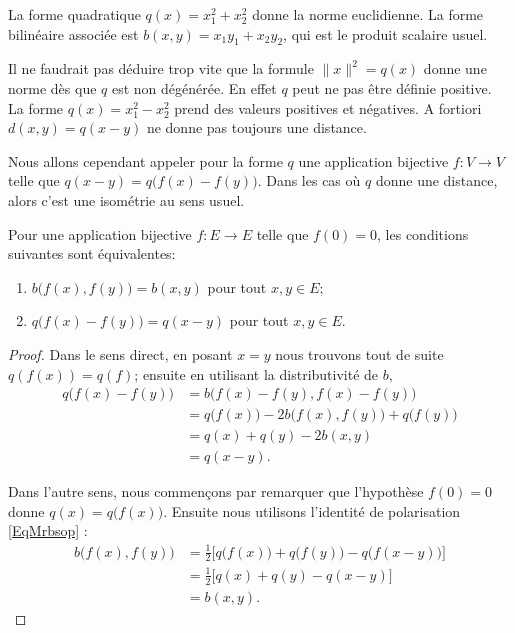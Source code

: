 \begin{example}
    La forme quadratique \( q(x)=x_1^2+x_2^2\) donne la norme euclidienne. La forme bilinéaire associée est \( b(x,y)=x_1y_1+x_2y_2\), qui est le produit scalaire usuel.
\end{example}

Il ne faudrait pas déduire trop vite que la formule \( \| x \|^2=q(x)\) donne une norme dès que \( q\) est non dégénérée. En effet \( q\) peut ne pas être définie positive. La forme \( q(x)=x_1^2-x_2^2\) prend des valeurs positives et négatives. A fortiori \( d(x,y)=q(x-y)\) ne donne pas toujours une distance.

Nous allons cependant appeler  pour la forme \( q\) une application bijective \( f\colon V\to V\) telle que \( q(x-y)=q\big( f(x)-f(y) \big)\). Dans les cas où \( q\) donne une distance, alors c'est une isométrie au sens usuel.

\begin{lemma}   \label{LemewGJmM}
    Pour une application bijective \( f\colon E\to E\) telle que \( f(0)=0\), les conditions suivantes sont équivalentes: 
    \begin{enumerate}
        \item
            \( b\big( f(x),f(y) \big)=b(x,y)\) pour tout \( x,y\in E\);
        \item
            \( q\big( f(x)-f(y) \big)=q(x-y)\) pour tout \( x,y\in E\).
    \end{enumerate}
\end{lemma}

\begin{proof}
    Dans le sens direct, en posant \( x=y\) nous trouvons tout de suite \( q(f(x))=q(f)\); ensuite en utilisant la distributivité de \( b\),
    \begin{subequations}
        \begin{align}
            q\big( f(x)-f(y) \big)&=b\big( f(x)-f(y),f(x)-f(y) \big)\\
            &=q\big( f(x) \big)-2b\big( f(x),f(y) \big)+q\big( f(y) \big)\\
            &=q(x)+q(y)-2b(x,y)\\
            &=q(x-y).
        \end{align}
    \end{subequations}
    
    Dans l'autre sens, nous commençons par remarquer que l'hypothèse \( f(0)=0\) donne \( q(x)=q\big( f(x) \big)\). Ensuite nous utilisons l'identité de polarisation \eqref{EqMrbsop} :
    \begin{subequations}
        \begin{align}
            b\big( f(x),f(y) \big)&=\frac{ 1 }{2}\big[ q\big( f(x) \big)+q\big( f(y) \big)-q\big( f(x-y) \big) \big]\\
            &=\frac{ 1 }{2}\big[ q(x)+q(y)-q(x-y) \big]\\
            &=b(x,y).
        \end{align}
    \end{subequations}
\end{proof}

